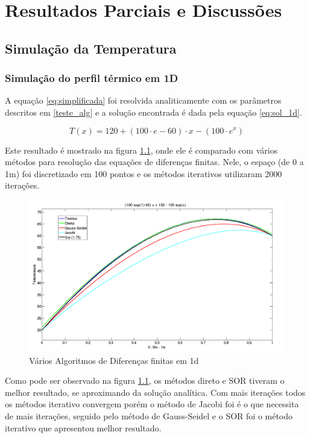 \chapter{Resultados Parciais e Discussões}\label{resultados}

\section{Simulação da Temperatura}

\subsection{Simulação do perfil térmico em 1D}

A equação \ref{eq:simplificada} foi resolvida analiticamente com os parâmetros descritos em \ref{teste_alg} e a solução encontrada é dada pela equação \ref{eq:sol_1d}.

\begin{equation}\label{eq:sol_1d}
T(x) = 120+(100 \cdot e - 60) \cdot x-(100 \cdot e^x)
\end{equation}

Este resultado é mostrado na figura \ref{fig:dif_fin_1d}, onde ele é comparado com vários métodos para resolução das equações de diferenças finitas. Nele, o espaço (de 0 a 1m) foi discretizado em 100 pontos e os métodos iterativos utilizaram 2000 iterações. 

\begin{figure}[H]
\centering
\includegraphics[width=\textwidth]{Figuras/dif_fin_1d}
\caption{Vários Algoritmos de Diferenças finitas em 1d}
\label{fig:dif_fin_1d}
\end{figure}
Como pode ser observado na figura \ref{fig:dif_fin_1d}, os métodos direto e SOR tiveram o melhor resultado, se aproximando da solução analítica. Com mais iterações todos os métodos iterativo convergem porém o método de Jacobi foi é o que necessita de mais iterações, seguido pelo método de Gauss-Seidel e o SOR foi o método iterativo que apresentou melhor resultado. 

